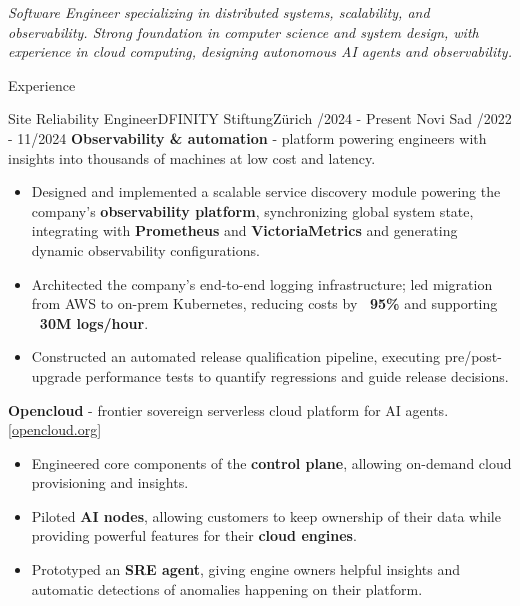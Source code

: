 \documentclass[]{mcdowellcv}
\begin{document}
    \makeheader

        \centering \textit{Software Engineer specializing in distributed systems, scalability, and observability. Strong foundation in computer science and system design, with experience in cloud computing, designing autonomous AI agents and observability.}

    \begin{cvsection}{Experience}

    \begin{cvsubsection}{Site Reliability Engineer}{DFINITY Stiftung}{Zürich /2024 - Present \linebreak Novi Sad /2022 - 11/2024}
    \vspace{0.8em}
    \textbf{Observability \& automation} - platform powering engineers with insights into thousands of machines at low cost and latency.
        \begin{itemize}
            \item Designed and implemented a scalable service discovery module powering the company's \textbf{observability platform}, synchronizing global system state, integrating with \textbf{Prometheus} and \textbf{VictoriaMetrics} and generating dynamic observability configurations.
            \item Architected the company's end-to-end logging infrastructure; led migration from AWS to on-prem Kubernetes, reducing costs by \textbf{~95\%} and supporting \textbf{~30M logs/hour}.
            \item Constructed an automated release qualification pipeline, executing pre/post-upgrade performance tests to quantify regressions and guide release decisions.
        \end{itemize}

        \textbf{Opencloud} - frontier sovereign serverless cloud platform for AI agents. \hfill [\href{https://opencloud.org/}{opencloud.org}]
        \begin{itemize}
            \item Engineered core components of the \textbf{control plane}, allowing on-demand cloud provisioning and insights.
            \item Piloted \textbf{AI nodes}, allowing customers to keep ownership of their data while providing powerful features for their \textbf{cloud engines}.
            \item Prototyped an \textbf{SRE agent}, giving engine owners helpful insights and automatic detections of anomalies happening on their platform.
        \end{itemize}


\end{cvsubsection}
\end{cvsection}
\end{document}

